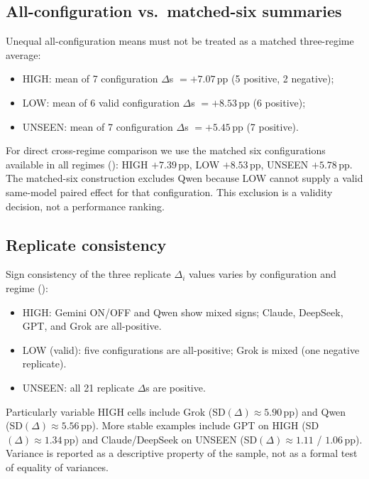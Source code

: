 \subsection{All-configuration vs.\ matched-six summaries}
Unequal all-configuration means must not be treated as a matched three-regime average:

\begin{itemize}[leftmargin=*]
  \item HIGH: mean of 7 configuration $\Delta$s $= +7.07$\,pp (5 positive, 2 negative);
  \item LOW: mean of 6 valid configuration $\Delta$s $= +8.53$\,pp (6 positive);
  \item UNSEEN: mean of 7 configuration $\Delta$s $= +5.45$\,pp (7 positive).
\end{itemize}

For direct cross-regime comparison we use the matched six configurations available in all regimes ():
HIGH $+7.39$\,pp, LOW $+8.53$\,pp, UNSEEN $+5.78$\,pp.
The matched-six construction excludes Qwen because LOW cannot supply a valid same-model paired effect for that configuration.
This exclusion is a validity decision, not a performance ranking.



\subsection{Replicate consistency}
Sign consistency of the three replicate $\Delta_i$ values varies by configuration and regime ():
\begin{itemize}[leftmargin=*]
  \item HIGH: Gemini ON/OFF and Qwen show mixed signs; Claude, DeepSeek, GPT, and Grok are all-positive.
  \item LOW (valid): five configurations are all-positive; Grok is mixed (one negative replicate).
  \item UNSEEN: all 21 replicate $\Delta$s are positive.
\end{itemize}
Particularly variable HIGH cells include Grok (SD$(\Delta)\approx 5.90$\,pp) and Qwen (SD$(\Delta)\approx 5.56$\,pp).
More stable examples include GPT on HIGH (SD$(\Delta)\approx 1.34$\,pp) and Claude/DeepSeek on UNSEEN (SD$(\Delta)\approx 1.11$ / $1.06$\,pp).
Variance is reported as a descriptive property of the sample, not as a formal test of equality of variances.




